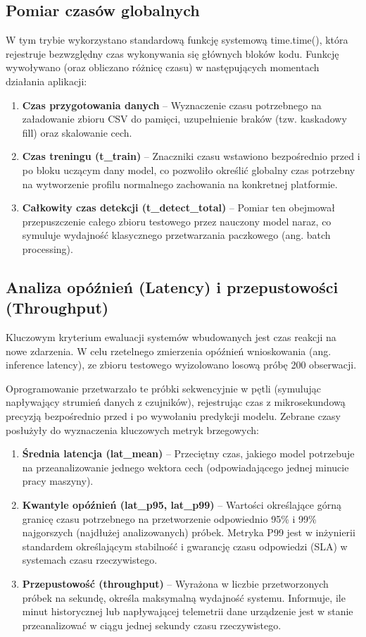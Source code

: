\documentclass[12pt,twoside]{article}
\begin{document}
\subsection{Pomiar czasów globalnych}
W tym trybie wykorzystano standardową funkcję systemową time.time(), która rejestruje bezwzględny czas wykonywania się głównych bloków kodu. Funkcję wywoływano (oraz obliczano różnicę czasu) w następujących momentach działania aplikacji:
\begin{enumerate}[label=\alph*), leftmargin=1.25cm]
    \item \textbf{Czas przygotowania danych} -- Wyznaczenie czasu potrzebnego na załadowanie zbioru CSV do pamięci, uzupełnienie braków (tzw. kaskadowy fill) oraz skalowanie cech.
    \item \textbf{Czas treningu (t\_train)} -- Znaczniki czasu wstawiono bezpośrednio przed i po bloku uczącym dany model, co pozwoliło określić globalny czas potrzebny na wytworzenie profilu normalnego zachowania na konkretnej platformie.
    \item \textbf{Całkowity czas detekcji (t\_detect\_total)} -- Pomiar ten obejmował przepuszczenie całego zbioru testowego przez nauczony model naraz, co symuluje wydajność klasycznego przetwarzania paczkowego (ang. batch processing).
\end{enumerate}

\subsection{Analiza opóźnień (Latency) i przepustowości (Throughput)}
Kluczowym kryterium ewaluacji systemów wbudowanych jest czas reakcji na nowe zdarzenia. W celu rzetelnego zmierzenia opóźnień wnioskowania (ang. inference latency), ze zbioru testowego wyizolowano losową próbę 200 obserwacji.

Oprogramowanie przetwarzało te próbki sekwencyjnie w pętli (symulując napływający strumień danych z czujników), rejestrując czas z mikrosekundową precyzją bezpośrednio przed i po wywołaniu predykcji modelu. Zebrane czasy posłużyły do wyznaczenia kluczowych metryk brzegowych:
\begin{enumerate}[label=\alph*), leftmargin=1.25cm]
\item \textbf{Średnia latencja (lat\_mean)} – Przeciętny czas, jakiego model potrzebuje na przeanalizowanie jednego wektora cech (odpowiadającego jednej minucie pracy maszyny).
\item \textbf{Kwantyle opóźnień (lat\_p95, lat\_p99)} – Wartości określające górną granicę czasu potrzebnego na przetworzenie odpowiednio 95\% i 99\% najgorszych (najdłużej analizowanych) próbek. Metryka P99 jest w inżynierii standardem określającym stabilność i gwarancję czasu odpowiedzi (SLA) w systemach czasu rzeczywistego.
\item \textbf{Przepustowość (throughput)} – Wyrażona w liczbie przetworzonych próbek na sekundę, określa maksymalną wydajność systemu. Informuje, ile minut historycznej lub napływającej telemetrii dane urządzenie jest w stanie przeanalizować w ciągu jednej sekundy czasu rzeczywistego.
\end{enumerate}
\end{document}
